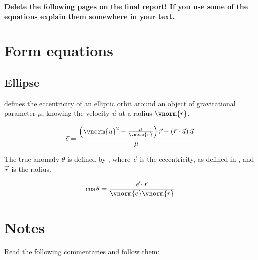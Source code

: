 \newpage

{\color{red}\textbf{Delete the following pages on the final report! If you use some of the equations explain them somewhere in your text.}}

\section*{Form equations}

\subsection*{Ellipse}

 defines the eccentricity of an elliptic orbit around an object of gravitational parameter $\mu$, knowing the velocity $\vec{u}$ at a radius $\vnorm{r}$.

\begin{equation}\label{eq:e_ellipse_urmu}
\vec{e} = \frac{\left(\vnorm{u}^2 - \frac{\mu}{\vnorm{r}}\right) \vec{r} - \left(\vec{r}\cdot\vec{u}\right) \vec{u}}{\mu}
\end{equation}

The true anomaly $\theta$ is defined by , where $\vec{e}$ is the eccentricity, as defined in , and $\vec{r}$ is the radius.

\begin{equation}\label{eq:theta_er}
\cos{\theta} = \frac{\vec{e}\cdot\vec{r}}{\vnorm{e} \vnorm{r}}
\end{equation}

\section*{Notes}

Read the following commentaries and follow them:

